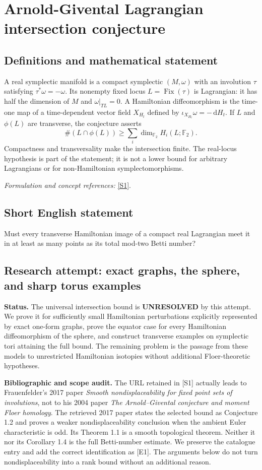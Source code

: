 \documentclass[11pt]{article}
\begin{document}
\section*{\texorpdfstring{Arnold-Givental Lagrangian intersection conjecture}{Arnold-Givental Lagrangian intersection conjecture}}\label{statement}
\subsection{Definitions and mathematical statement}
A real symplectic manifold is a compact symplectic $(M,\omega)$ with an involution $\tau$ satisfying $\tau^*\omega=-\omega$. Its nonempty fixed locus $L=\operatorname{Fix}(\tau)$ is Lagrangian: it has half the dimension of $M$ and $\omega|_{TL}=0$. A Hamiltonian diffeomorphism is the time-one map of a time-dependent vector field $X_{H_t}$ defined by $\iota_{X_{H_t}}\omega=-{\,\mathrm{d}} H_t$. If $L$ and $\phi(L)$ are transverse, the conjecture asserts
\[
 \#(L\cap\phi(L))\ge\sum_i\dim_{{\mathbb{F}}_2}H_i(L;{\mathbb{F}}_2).
\]
Compactness and transversality make the intersection finite. The real-locus hypothesis is part of the statement; it is not a lower bound for arbitrary Lagrangians or for non-Hamiltonian symplectomorphisms.
\par\smallskip\textit{Formulation and concept references:} \href{https://arxiv.org/html/1708.09628v1}{[S1]}.

\subsection{Short English statement}
Must every transverse Hamiltonian image of a compact real Lagrangian meet it in at least as many points as its total mod-two Betti number?
\subsection{Research attempt: exact graphs, the sphere, and sharp torus examples}
\textbf{Status.} The universal intersection bound is \textbf{UNRESOLVED} by this attempt. We prove it for sufficiently small Hamiltonian perturbations explicitly represented by exact one-form graphs, prove the equator case for every Hamiltonian diffeomorphism of the sphere, and construct transverse examples on symplectic tori attaining the full bound. The remaining problem is the passage from these models to unrestricted Hamiltonian isotopies without additional Floer-theoretic hypotheses.

\textbf{Bibliographic and scope audit.} The URL retained in [S1] actually leads to Frauenfelder's 2017 paper \emph{Smooth nondisplaceability for fixed point sets of involutions}, not to his 2004 paper \emph{The Arnold--Givental conjecture and moment Floer homology}. The retrieved 2017 paper states the selected bound as Conjecture 1.2 and proves a weaker nondisplaceability conclusion when the ambient Euler characteristic is odd. Its Theorem 1.1 is a smooth topological theorem. Neither it nor its Corollary 1.4 is the full Betti-number estimate. We preserve the catalogue entry and add the correct identification as [E1]. The arguments below do not turn nondisplaceability into a rank bound without an additional reason.
\end{document}
